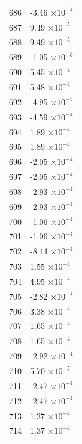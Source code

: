 \documentclass[a4paper,11pt]{article}
\begin{document}
\begin{center}
\begin{longtable}{|R{1.5cm}|R{2.5cm}|}
  686 &        -3.46 $\times 10^{          -4}$ \\
  687 &         9.49 $\times 10^{          -5}$ \\
  688 &         9.49 $\times 10^{          -5}$ \\
  689 &        -1.05 $\times 10^{          -3}$ \\
  690 &         5.45 $\times 10^{          -4}$ \\
  691 &         5.48 $\times 10^{          -4}$ \\
  692 &        -4.95 $\times 10^{          -5}$ \\
  693 &        -4.59 $\times 10^{          -4}$ \\
  694 &         1.89 $\times 10^{          -4}$ \\
  695 &         1.89 $\times 10^{          -4}$ \\
  696 &        -2.05 $\times 10^{          -4}$ \\
  697 &        -2.05 $\times 10^{          -4}$ \\
  698 &        -2.93 $\times 10^{          -4}$ \\
  699 &        -2.93 $\times 10^{          -4}$ \\
  700 &        -1.06 $\times 10^{          -4}$ \\
  701 &        -1.06 $\times 10^{          -4}$ \\
  702 &        -8.44 $\times 10^{          -4}$ \\
  703 &         1.55 $\times 10^{          -4}$ \\
  704 &         4.95 $\times 10^{          -4}$ \\
  705 &        -2.82 $\times 10^{          -4}$ \\
  706 &         3.38 $\times 10^{          -4}$ \\
  707 &         1.65 $\times 10^{          -4}$ \\
  708 &         1.65 $\times 10^{          -4}$ \\
  709 &        -2.92 $\times 10^{          -4}$ \\
  710 &         5.70 $\times 10^{          -5}$ \\
  711 &        -2.47 $\times 10^{          -4}$ \\
  712 &        -2.47 $\times 10^{          -4}$ \\
  713 &         1.37 $\times 10^{          -4}$ \\
  714 &         1.37 $\times 10^{          -4}$ \\

\end{longtable}
\end{center}
\end{document}
